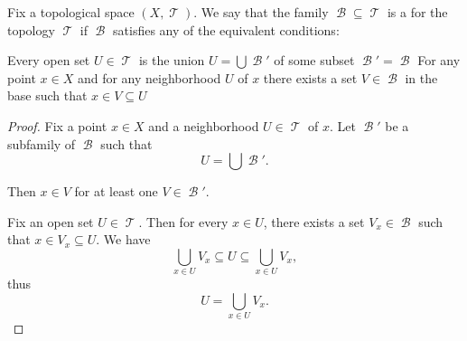 \begin{definition}\label{def:topological_base}
  Fix a topological space \( (X, \mscrT) \). We say that the family \( \mscrB \subseteq \mscrT \) is a  for the topology \( \mscrT \) if \( \mscrB \) satisfies any of the equivalent conditions:
  \begin{DefEnum}
     Every open set \( U \in \mscrT \) is the union \( U = \bigcup \mscrB' \) of some subset \( \mscrB' = \mscrB \)
     For any point \( x \in X \) and for any neighborhood \( U \) of \( x \) there exists a set \( V \in \mscrB \) in the base such that \( x \in V \subseteq U \)
  \end{DefEnum}
\end{definition}
\begin{proof}
   Fix a point \( x \in X \) and a neighborhood \( U \in \mscrT \) of \( x \). Let \( \mscrB' \) be a subfamily of \( \mscrB \) such that
  \begin{equation*}
    U = \bigcup \mscrB'.
  \end{equation*}

  Then \( x \in V \) for at least one \( V \in \mscrB' \).

   Fix an open set \( U \in \mscrT \). Then for every \( x \in U \), there exists a set \( V_x \in \mscrB \) such that \( x \in V_x \subseteq U \). We have
  \begin{equation*}
    \bigcup_{x \in U} V_x \subseteq U \subseteq \bigcup_{x \in U} V_x,
  \end{equation*}
  thus
  \begin{equation*}
    U = \bigcup_{x \in U} V_x.
  \end{equation*}
\end{proof}


